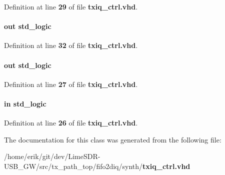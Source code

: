 Definition at line {\bf 29} of file {\bf txiq\+\_\+ctrl.\+vhd}.

\paragraph[{txant\+\_\+en}]{ {\bfseries \textcolor{keywordflow}{out}\textcolor{vhdlchar}{ }} {\bfseries \textcolor{comment}{std\+\_\+logic}\textcolor{vhdlchar}{ }} \hspace{0.3cm}{\ttfamily [Port]}}\label{classtxiq__ctrl_aba43bfcb5d3126b6d305800a684bd902}


Definition at line {\bf 32} of file {\bf txiq\+\_\+ctrl.\+vhd}.

\paragraph[{txiq\+\_\+en}]{ {\bfseries \textcolor{keywordflow}{out}\textcolor{vhdlchar}{ }} {\bfseries \textcolor{comment}{std\+\_\+logic}\textcolor{vhdlchar}{ }} \hspace{0.3cm}{\ttfamily [Port]}}\label{classtxiq__ctrl_a255ea29332ccdd2134d634f6e13c7d0d}


Definition at line {\bf 27} of file {\bf txiq\+\_\+ctrl.\+vhd}.

\paragraph[{txiq\+\_\+rdreq\+\_\+in}]{ {\bfseries \textcolor{keywordflow}{in}\textcolor{vhdlchar}{ }} {\bfseries \textcolor{comment}{std\+\_\+logic}\textcolor{vhdlchar}{ }} \hspace{0.3cm}{\ttfamily [Port]}}\label{classtxiq__ctrl_ad65241bbf008ec79bb2020061ba56b5d}


Definition at line {\bf 26} of file {\bf txiq\+\_\+ctrl.\+vhd}.



The documentation for this class was generated from the following file\+:\begin{DoxyCompactItemize}
\item 
/home/erik/git/dev/\+Lime\+S\+D\+R-\/\+U\+S\+B\+\_\+\+G\+W/src/tx\+\_\+path\+\_\+top/fifo2diq/synth/{\bf txiq\+\_\+ctrl.\+vhd}\end{DoxyCompactItemize}
